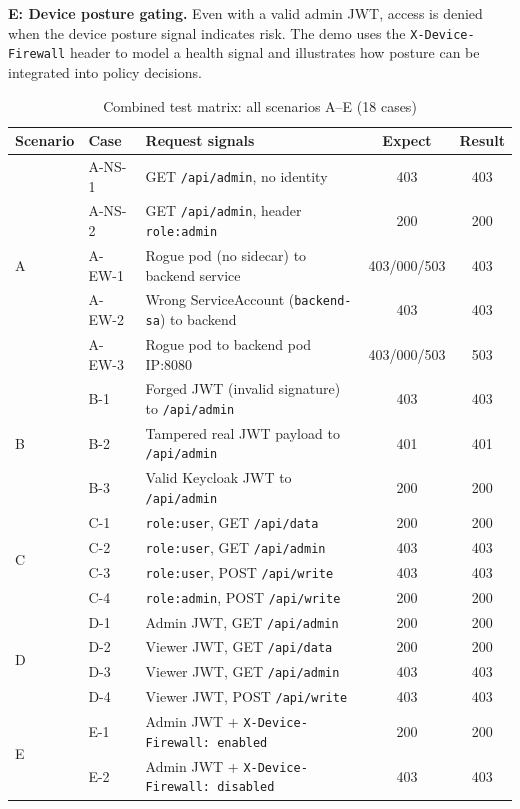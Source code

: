 \documentclass[conference]{IEEEtran}
\begin{document}
\textbf{E: Device posture gating.} Even with a valid admin JWT, access is denied when
the device posture signal indicates risk. The demo uses the \texttt{X-Device-Firewall}
header to model a health signal and illustrates how posture can be integrated into
policy decisions.

\begin{table}[!t]
\caption{Combined test matrix: all scenarios A--E (18 cases)}
\label{tab:allcases}
\centering
\scriptsize
\begin{tabularx}{\columnwidth}{l l >{\raggedright\arraybackslash}X c c}
\toprule
Scenario & Case & Request signals & Expect & Result \\
\midrule
\multirow{5}{*}{A}
  & A-NS-1 & GET \texttt{/api/admin}, no identity & 403 & 403 \\
  & A-NS-2 & GET \texttt{/api/admin}, header \texttt{role:admin} & 200 & 200 \\
  & A-EW-1 & Rogue pod (no sidecar) to backend service & 403/000/503 & 403 \\
  & A-EW-2 & Wrong ServiceAccount (\texttt{backend-sa}) to backend & 403 & 403 \\
  & A-EW-3 & Rogue pod to backend pod IP:8080 & 403/000/503 & 503 \\
\midrule
\multirow{3}{*}{B}
  & B-1 & Forged JWT (invalid signature) to \texttt{/api/admin} & 403 & 403 \\
  & B-2 & Tampered real JWT payload to \texttt{/api/admin} & 401 & 401 \\
  & B-3 & Valid Keycloak JWT to \texttt{/api/admin} & 200 & 200 \\
\midrule
\multirow{4}{*}{C}
  & C-1 & \texttt{role:user}, GET \texttt{/api/data} & 200 & 200 \\
  & C-2 & \texttt{role:user}, GET \texttt{/api/admin} & 403 & 403 \\
  & C-3 & \texttt{role:user}, POST \texttt{/api/write} & 403 & 403 \\
  & C-4 & \texttt{role:admin}, POST \texttt{/api/write} & 200 & 200 \\
\midrule
\multirow{4}{*}{D}
  & D-1 & Admin JWT, GET \texttt{/api/admin} & 200 & 200 \\
  & D-2 & Viewer JWT, GET \texttt{/api/data} & 200 & 200 \\
  & D-3 & Viewer JWT, GET \texttt{/api/admin} & 403 & 403 \\
  & D-4 & Viewer JWT, POST \texttt{/api/write} & 403 & 403 \\
\midrule
\multirow{2}{*}{E}
  & E-1 & Admin JWT + \texttt{X-Device-Firewall: enabled} & 200 & 200 \\
  & E-2 & Admin JWT + \texttt{X-Device-Firewall: disabled} & 403 & 403 \\
\bottomrule
\end{tabularx}
\end{table}
\end{document}
